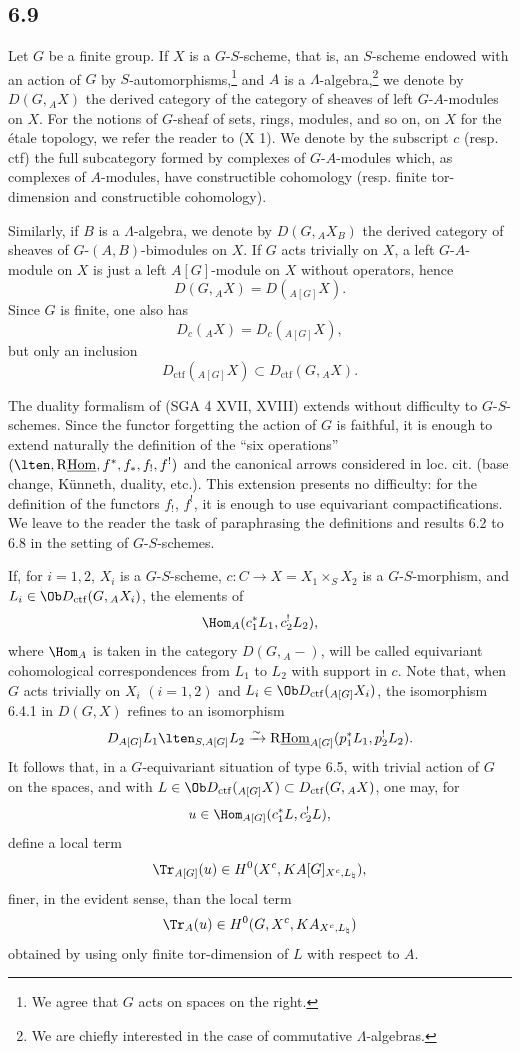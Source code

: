 \subsection*{6.9}
Let $G$ be a finite group. If $X$ is a $G$-$S$-scheme, that is, an $S$-scheme endowed with an action of $G$ by $S$-automorphisms,\footnote{We agree that $G$ acts on spaces on the right.} and $A$ is a $\Lambda$-algebra,\footnote{We are chiefly interested in the case of commutative $\Lambda$-algebras.} we denote by $D(G,{}_AX)$ the derived category of the category of sheaves of left $G$-$A$-modules on $X$. For the notions of $G$-sheaf of sets, rings, modules, and so on, on $X$ for the étale topology, we refer the reader to (X 1). We denote by the subscript $c$ (resp. ctf) the full subcategory formed by complexes of $G$-$A$-modules which, as complexes of $A$-modules, have constructible cohomology (resp. finite tor-dimension and constructible cohomology).

Similarly, if $B$ is a $\Lambda$-algebra, we denote by $D(G,{}_AX_B)$ the derived category of sheaves of $G$-$(A,B)$-bimodules on $X$. If $G$ acts trivially on $X$, a left $G$-$A$-module on $X$ is just a left $A[G]$-module on $X$ without operators, hence
\[
D(G,{}_AX)=D({}_{A[G]}X).
\]
Since $G$ is finite, one also has
\[
D_c({}_AX)=D_c({}_{A[G]}X),
\]
but only an inclusion
\[
D_{\mathrm{ctf}}({}_{A[G]}X)\subset D_{\mathrm{ctf}}(G,{}_AX).
\]

The duality formalism of (SGA 4 XVII, XVIII) extends without difficulty to $G$-$S$-schemes. Since the functor forgetting the action of $G$ is faithful, it is enough to extend naturally the definition of the “six operations” $(\lten,\mathrm{R}\underline{\mathrm{Hom}},f^*,f_*,f_!,f^!)$ and the canonical arrows considered in loc. cit. (base change, Künneth, duality, etc.). This extension presents no difficulty: for the definition of the functors $f_!$, $f^!$, it is enough to use equivariant compactifications. We leave to the reader the task of paraphrasing the definitions and results 6.2 to 6.8 in the setting of $G$-$S$-schemes.

If, for $i=1,2$, $X_i$ is a $G$-$S$-scheme, $c:C\to X=X_1\times_SX_2$ is a $G$-$S$-morphism, and $L_i\in\Ob D_{\mathrm{ctf}}(G,{}_AX_i)$, the elements of
\[
\Hom_A(c_1^*L_1,c_2^!L_2),
\]
where $\Hom_A$ is taken in the category $D(G,{}_A-)$, will be called equivariant cohomological correspondences from $L_1$ to $L_2$ with support in $c$. Note that, when $G$ acts trivially on $X_i$ $(i=1,2)$ and $L_i\in\Ob D_{\mathrm{ctf}}({}_{A[G]}X_i)$, the isomorphism 6.4.1 in $D(G,X)$ refines to an isomorphism
\[
D_{A[G]}L_1\lten_{S,A[G]}L_2
\xrightarrow{\sim}
\mathrm{R}\underline{\mathrm{Hom}}_{A[G]}(p_1^*L_1,p_2^!L_2).
\]
It follows that, in a $G$-equivariant situation of type 6.5, with trivial action of $G$ on the spaces, and with $L\in\Ob D_{\mathrm{ctf}}({}_{A[G]}X)\subset D_{\mathrm{ctf}}(G,{}_AX)$, one may, for
\[
u\in\Hom_{A[G]}(c_1^*L,c_2^!L),
\]
define a local term
\[
\Tr_{A[G]}(u)\in H^0(X^c,KA[G]_{X^c,L_{\natural}}),
\]
finer, in the evident sense, than the local term
\[
\Tr_A(u)\in H^0(G,X^c,KA_{X^c,L_{\natural}})
\]
obtained by using only finite tor-dimension of $L$ with respect to $A$.

